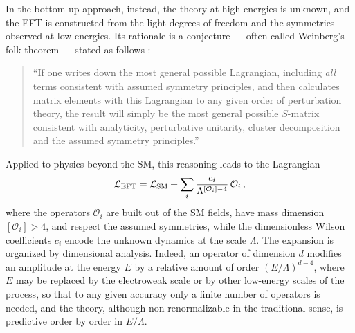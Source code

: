 In the bottom-up approach, instead, the theory at high energies is unknown, and the EFT is
constructed from the light degrees of freedom and the symmetries observed at low energies. Its
rationale is a conjecture --- often called Weinberg's folk theorem --- stated as follows \cite{Weinberg:1978kz}:
\begin{quotation}
``If one writes down the most general
possible Lagrangian, including \emph{all} terms consistent with assumed symmetry principles,
and then calculates matrix elements with this Lagrangian to any given order of perturbation theory, the result
will simply be the most general possible $S$-matrix consistent with analyticity, perturbative unitarity, cluster decomposition and the assumed symmetry principles.''
\end{quotation}
Applied to physics beyond the SM, this reasoning leads to the Lagrangian
\begin{equation}\label{eq:intro_Leff}
    \mathcal L_{\rm EFT} = \mathcal L_{\rm SM} + \sum_i \frac{c_i}{\Lambda^{[\mathcal O_i]-4}}\,\mathcal O_i\,,
\end{equation}
where the operators $\mathcal O_i$ are built out of the SM fields, have mass dimension
$[\mathcal O_i]>4$, and respect the assumed symmetries, while the dimensionless Wilson coefficients
$c_i$ encode the unknown dynamics at the scale $\Lambda$. The expansion is organized by dimensional
analysis. Indeed, an operator of dimension $d$ modifies an amplitude at the energy $E$ by a relative
amount of order $(E/\Lambda)^{d-4}$, where $E$ may be replaced by the electroweak scale or by other
low-energy scales of the process, so that to any given accuracy only a finite number of operators is
needed, and the theory, although non-renormalizable in the traditional sense, is predictive order by
order in $E/\Lambda$.


